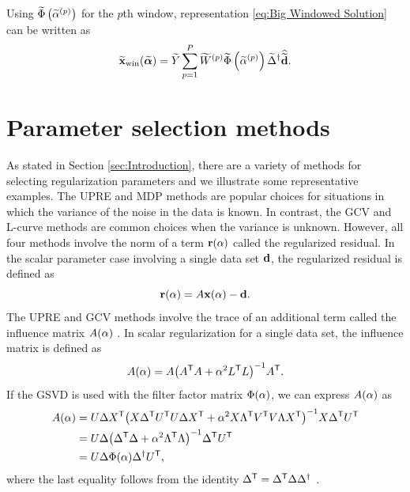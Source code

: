 \documentclass[12pt]{article}
\begin{document}
Using $\widetilde{\Phi}\left(\widetilde{\alpha}^{(p)}\right)$ for the $p$th window, representation \eqref{eq:Big Windowed Solution} can be written as
\begin{equation}
\label{eq:Big Windowed Solution 2}
    \widetilde{\mathbf{x}}_{\text{win}}(\widetilde{\bm{\alpha}}) = \widetilde{Y}\sum_{p=1}^{P} \widetilde{W}^{(p)}\widetilde{\Phi}\left(\widetilde{\alpha}^{(p)}\right){\widetilde{\Delta}}^\dagger\widehat{\widetilde{\mathbf{d}}}.
\end{equation}

\section{Parameter selection methods} \label{sec:Methods}
As stated in Section \ref{sec:Introduction}, there are a variety of methods for selecting regularization parameters and we illustrate some representative examples. The UPRE and MDP methods are popular choices for situations in which the variance of the noise in the data is known. In contrast, the GCV and L-curve methods are common choices when the variance is unknown. However, all four methods involve the norm of a term $\mathbf{r}(\alpha)$ called the regularized residual. In the scalar parameter case involving a single data set $\mathbf{d}$, the regularized residual is defined as
\begin{equation}
\label{eq:Regularized Residual}
\mathbf{r}(\alpha) = A\mathbf{x}(\alpha) - \mathbf{d}.
\end{equation}
The UPRE and GCV methods involve the trace of an additional term called the influence matrix $A(\alpha)$ \cite[p.~98]{Vogel:2002}. In scalar regularization for a single data set, the influence matrix is defined as
\begin{equation}
    \label{eq:Influence matrix}
    A(\alpha) = A{\left({A}^\mathsf{T}A + \alpha^2{L}^\mathsf{T}L\right)}^{-1}{A}^\mathsf{T}.
\end{equation}
If the GSVD is used with the filter factor matrix $\Phi(\alpha)$, we can express $A(\alpha)$ as
\begin{align*}
    A(\alpha) &= U\Delta{X}^\mathsf{T}{\left(X{\Delta}^\mathsf{T}{U}^\mathsf{T}U\Delta{X}^\mathsf{T} + \alpha^2 X{\Lambda}^\mathsf{T}{V}^\mathsf{T}V\Lambda{X}^\mathsf{T}\right)}^{-1}X{\Delta}^\mathsf{T}{U}^\mathsf{T} \\
    &= U\Delta{\left({\Delta}^\mathsf{T}\Delta + \alpha^2 {\Lambda}^\mathsf{T}\Lambda\right)}^{-1}{\Delta}^\mathsf{T}{U}^\mathsf{T} \\
    &= U\Delta\Phi(\alpha){\Delta}^\dagger{U}^\mathsf{T},
\end{align*}
where the last equality follows from the identity ${\Delta}^\mathsf{T} = {\Delta}^\mathsf{T}\Delta{\Delta}^\dagger$ \cite{Byrne}. \par
\end{document}
